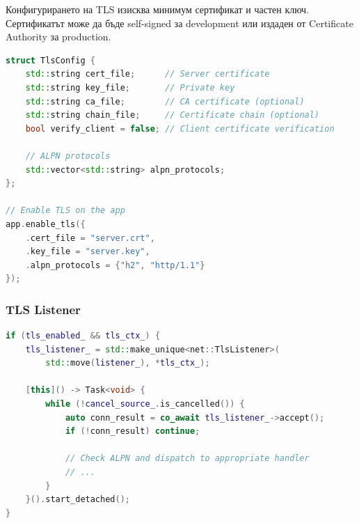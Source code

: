 Конфигурирането на TLS изисква минимум сертификат и частен ключ. Сертификатът може да бъде self-signed за development или издаден от Certificate Authority за production.

\begin{lstlisting}[language=C++, basicstyle=\small\ttfamily, caption={TLS configuration}]
struct TlsConfig {
    std::string cert_file;      // Server certificate
    std::string key_file;       // Private key
    std::string ca_file;        // CA certificate (optional)
    std::string chain_file;     // Certificate chain (optional)
    bool verify_client = false; // Client certificate verification
    
    // ALPN protocols
    std::vector<std::string> alpn_protocols;
};

// Enable TLS on the app
app.enable_tls({
    .cert_file = "server.crt",
    .key_file = "server.key",
    .alpn_protocols = {"h2", "http/1.1"}
});
\end{lstlisting}

\subsubsection{TLS Listener}

\begin{lstlisting}[language=C++, basicstyle=\small\ttfamily, caption={TLS listener}]
if (tls_enabled_ && tls_ctx_) {
    tls_listener_ = std::make_unique<net::TlsListener>(
        std::move(listener_), *tls_ctx_);
    
    [this]() -> Task<void> {
        while (!cancel_source_.is_cancelled()) {
            auto conn_result = co_await tls_listener_->accept();
            if (!conn_result) continue;
            
            // Check ALPN and dispatch to appropriate handler
            // ...
        }
    }().start_detached();
}
\end{lstlisting}
